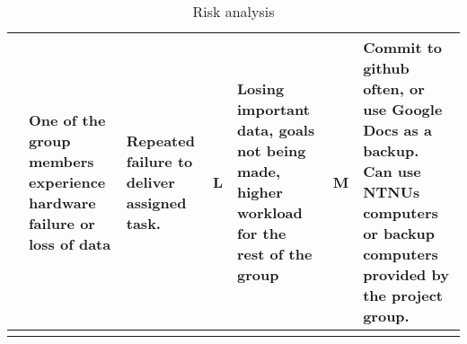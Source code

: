 \begin{landscape}
\begin{longtable}{| p{0.4cm} | p{4cm} | p{4cm} | p{2cm} | p{4cm} | p{1cm} | p{4cm} |}
	\stepcounter{riskId}
	\centering
		\arabic{riskId} &
		One of the group members experience hardware failure or loss of data &
        Repeated failure to deliver assigned task.
		& \centering L &
		Losing important data, goals not being made, higher workload for the
		rest of the group &
		\centering M &
		Commit to github often, or use Google Docs as a backup. Can use NTNUs
		computers or backup computers provided by the project group. \\
	\hline
\caption{Risk analysis}
\end{longtable}

\end{landscape}
